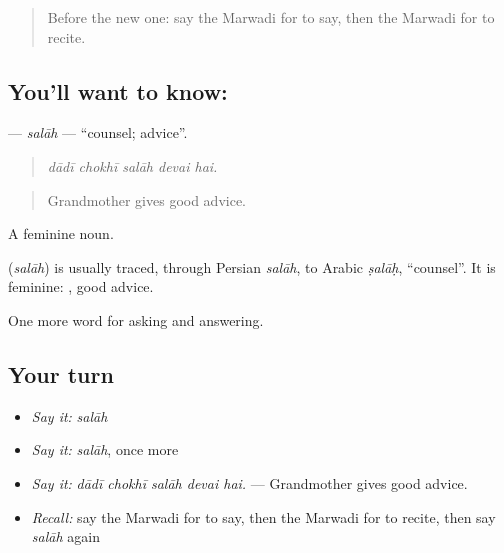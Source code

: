 \label{lesson:MW-C268-salah}



\begin{quote}
Before the new one: say the Marwadi for to say, then the Marwadi for to recite.
\end{quote}

\subsection*{You'll want to know: }
\textbf{} — \emph{salāh} — \textquotedblleft{}counsel; advice\textquotedblright{}.

\begin{quote}
    
\end{quote}

\begin{quote}
\emph{dādī chokhī salāh devai hai.}
\end{quote}

\begin{quote}
Grandmother gives good advice.
\end{quote}

A feminine noun.

\begin{cousinweb}
\textbf{} (\emph{salāh}) is usually traced, through Persian \emph{salāh}, to Arabic \emph{ṣalāḥ}, \textquotedblleft{}counsel\textquotedblright{}. It is feminine: \textbf{ }, good advice.
\end{cousinweb}

\begin{grammarlens}[title={What you've built}]
One more word for asking and answering.
\end{grammarlens}

\subsection*{Your turn}
\begin{itemize}
\raggedright
  \item \emph{Say it:} \emph{salāh}
  \item \emph{Say it:} \emph{salāh}, once more
  \item \emph{Say it:} \emph{dādī chokhī salāh devai hai.} — Grandmother gives good advice.
  \item \emph{Recall:} say the Marwadi for to say, then the Marwadi for to recite, then say \emph{salāh} again
\end{itemize}

